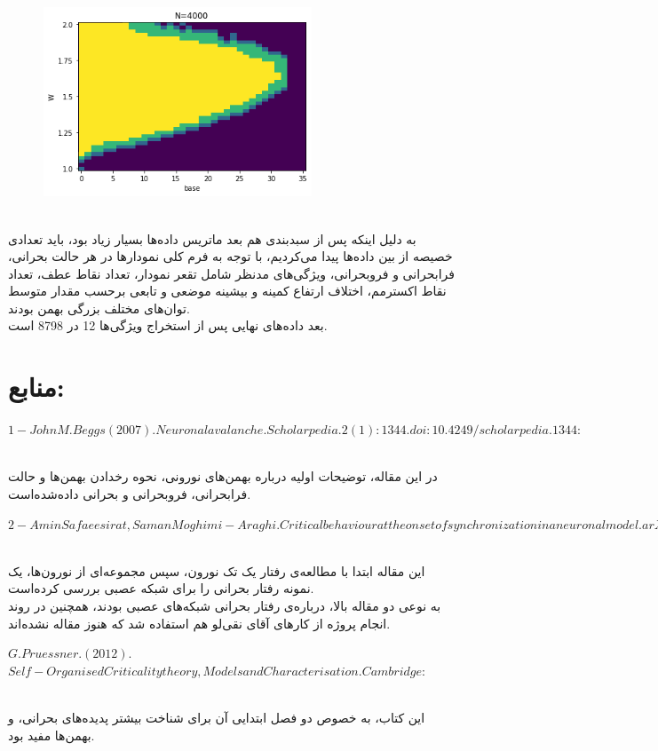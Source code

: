 \documentclass[12pt]{article}
\begin{document}
\begin{figure}[t]
\includegraphics[width=8cm]{n4000}
\centering
\end{figure}
\\
به دلیل اینکه پس از سبدبندی هم بعد ماتریس داده‌ها بسیار زیاد بود، باید تعدادی خصیصه از بین داده‌ها پیدا می‌کردیم، با توجه به فرم کلی نمودارها در هر حالت بحرانی، فرابحرانی و فروبحرانی، ویژگی‌های مدنظر شامل تقعر نمودار، تعداد نقاط عطف، تعداد نقاط اکسترمم، اختلاف ارتفاع کمینه و بیشینه موضعی و تابعی برحسب مقدار متوسط توان‌های مختلف بزرگی بهمن بودند.
\\
بعد داده‌های نهایی پس از استخراج ویژگی‌ها 12 در 8798 است.

\section{منابع:}

\begin{flushleft}
$1-John M. Beggs (2007). Neuronal avalanche. Scholarpedia. 2(1):1344. doi:10.4249/scholarpedia.1344:$
\end{flushleft}
\\
در این مقاله، توضیحات اولیه درباره بهمن‌های نورونی، نحوه رخدادن بهمن‌ها و حالت فرابحرانی، فروبحرانی و بحرانی داده‌شده‌است.
\\
\begin{flushleft}
$2-Amin Safaeesirat, Saman Moghimi-Araghi. Critical behaviour at the onset of synchronization in a neuronal model. arXiv:2010.01493v2:$
\end{flushleft}
\\
این مقاله ابتدا با مطالعه‌ی رفتار یک تک نورون، سپس مجموعه‌ای از نورون‌ها، یک نمونه رفتار بحرانی را برای شبکه عصبی بررسی کرده‌است.
\\
به نوعی دو مقاله بالا، درباره‌ی رفتار بحرانی شبکه‌های عصبی بودند، همچنین در روند انجام پروژه از کارهای آقای نقی‌لو هم استفاده شد که هنوز مقاله نشده‌اند.
\\
\begin{flushleft}
$G. Pruessner.(2012).$
\\
$Self-Organised Criticality theory, Models and Characterisation.Cambridge:$
\end{flushleft}
\\
این کتاب، به خصوص دو فصل ابتدایی آن برای شناخت بیشتر پدیده‌های بحرانی، و بهمن‌ها مفید بود.
\\
\end{document}
